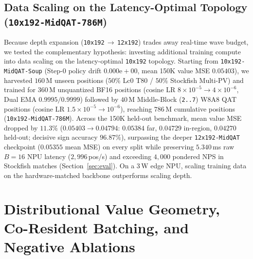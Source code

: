 \documentclass[10pt,twocolumn]{article}
\begin{document}
\subsection{Data Scaling on the Latency-Optimal Topology (\texttt{10x192-MidQAT-786M})}
Because depth expansion (\texttt{10x192}\,$\to$\,\texttt{12x192}) trades away real-time wave budget, we tested the complementary hypothesis: investing additional training compute into data scaling on the latency-optimal \texttt{10x192} topology. Starting from \texttt{10x192-MidQAT-Soup} (Step-0 policy drift $0.000\text{e}{+}00$, mean 150K value MSE $0.05403$), we harvested $160$\,M unseen positions ($50\%$ Lc0 T80 / $50\%$ Stockfish Multi-PV) and trained for $360$\,M unquantized BF16 positions (cosine LR $8\times 10^{-5} \to 4\times 10^{-6}$, Dual EMA $0.9995/0.9999$) followed by $40$\,M Middle-Block (\texttt{2..7}) W8A8 QAT positions (cosine LR $1.5\times 10^{-5} \to 10^{-6}$), reaching $786$\,M cumulative positions (\texttt{10x192-MidQAT-786M}). Across the 150K held-out benchmark, mean value MSE dropped by $11.3\%$ ($0.05403 \to 0.04794$: $0.05384$ far, $0.04729$ in-region, $0.04270$ held-out; decisive sign accuracy $96.87\%$), surpassing the deeper \texttt{12x192-MidQAT} checkpoint ($0.05355$ mean MSE) on every split while preserving $5.340$\,ms raw $B=16$ NPU latency ($2{,}996$\,pos/s) and exceeding $4{,}000$ pondered NPS in Stockfish matches (Section~\ref{sec:eval}). On a 3\,W edge NPU, scaling training data on the hardware-matched backbone outperforms scaling depth.

\section{Distributional Value Geometry, Co-Resident Batching, and Negative Ablations}
\label{sec:hlgauss_gear}
\end{document}
